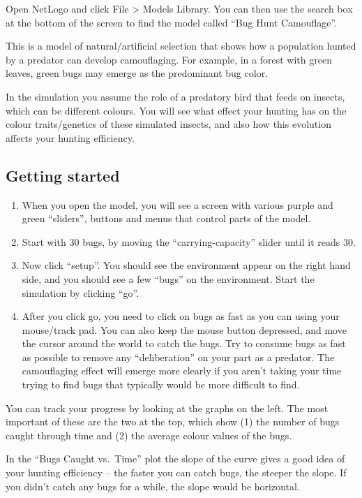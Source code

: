 \documentclass[
  a4paper]{book}
\providecommand{\tightlist}{%
  \setlength{\itemsep}{0pt}\setlength{\parskip}{0pt}}
\begin{document}
Open NetLogo and click File \textgreater{} Models Library. You can then use the search box at the bottom of the screen to find the model called ``Bug Hunt Camouflage''.

This is a model of natural/artificial selection that shows how a population hunted by a predator can develop camouflaging. For example, in a forest with green leaves, green bugs may emerge as the predominant bug color.

In the simulation you assume the role of a predatory bird that feeds on insects, which can be different colours. You will see what effect your hunting has on the colour traits/genetics of these simulated insects, and also how this evolution affects your hunting efficiency.

\subsection{Getting started}\label{getting-started}

\begin{enumerate}
\def\labelenumi{\arabic{enumi}.}
\tightlist
\item
  When you open the model, you will see a screen with various purple and green ``sliders'', buttons and menus that control parts of the model.
\item
  Start with 30 bugs, by moving the ``carrying-capacity'' slider until it reads 30.
\item
  Now click ``setup''. You should see the environment appear on the right hand side, and you should see a few ``bugs'' on the environment. Start the simulation by clicking ``go''.
\item
  After you click go, you need to click on bugs as fast as you can using your mouse/track pad. You can also keep the mouse button depressed, and move the cursor around the world to catch the bugs. Try to consume bugs as fast as possible to remove any ``deliberation'' on your part as a predator. The camouflaging effect will emerge more clearly if you aren't taking your time trying to find bugs that typically would be more difficult to find.
\end{enumerate}

You can track your progress by looking at the graphs on the left. The most important of these are the two at the top, which show (1) the number of bugs caught through time and (2) the average colour values of the bugs.

In the ``Bugs Caught vs.~Time'' plot the slope of the curve gives a good idea of your hunting efficiency -- the faster you can catch bugs, the steeper the slope. If you didn't catch any bugs for a while, the slope would be horizontal.
\end{document}
